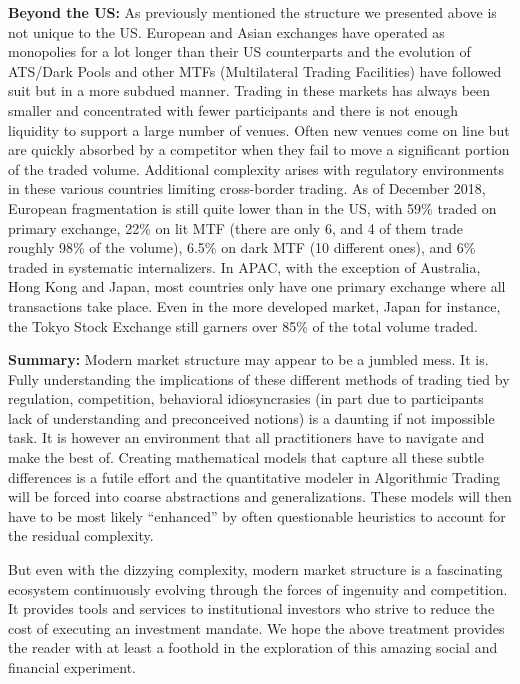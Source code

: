 \noindent\textbf{Beyond the US:} As previously mentioned the structure we presented above is not unique to the US. European and Asian exchanges have operated as monopolies for a lot longer than their US counterparts and the evolution of ATS/Dark Pools and other MTFs (Multilateral Trading Facilities) have followed suit but in a more subdued manner. Trading in these markets has always been smaller and concentrated with fewer participants and there is not enough liquidity to support a large number of venues. Often new venues come on line but are quickly absorbed by a competitor when they fail to move a significant portion of the traded volume. Additional complexity arises with regulatory environments in these various countries limiting cross-border trading. As of December 2018, European fragmentation is still quite lower than in the US, with 59\% traded on primary exchange, 22\% on lit MTF (there are only 6, and 4 of them trade roughly 98\% of the volume), 6.5\% on dark MTF (10 different ones), and 6\% traded in systematic internalizers. In APAC, with the exception of Australia, Hong Kong and Japan, most countries only have one primary exchange where all transactions take place. Even in the more developed market, Japan for instance, the Tokyo Stock Exchange still garners over 85\% of the total volume traded. \twomedskip


\noindent\textbf{Summary:} Modern market structure may appear to be a jumbled mess. It is. Fully understanding the implications of these different methods of trading tied by regulation, competition, behavioral idiosyncrasies (in part due to participants lack of understanding and preconceived notions)  is a daunting if not impossible task. It is however an environment that all practitioners have to navigate and make the best of. Creating mathematical models that capture all these subtle differences is a futile effort and the quantitative modeler in Algorithmic Trading will be forced into coarse abstractions and generalizations. These models will then have to be most likely ``enhanced'' by often questionable heuristics to account for the residual complexity. 

But even with the dizzying complexity, modern market structure is a fascinating ecosystem continuously evolving through the forces of ingenuity and competition. It provides tools and services to institutional investors who strive to reduce the cost of executing an investment mandate. We hope the above treatment provides the reader with at least a foothold in the exploration of this amazing social and financial experiment.


